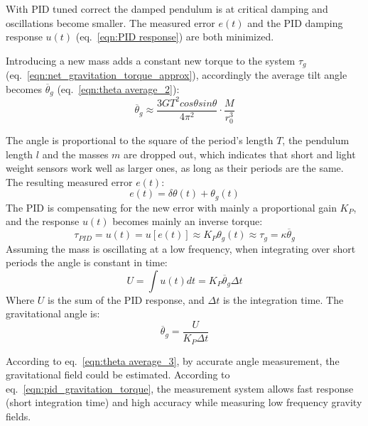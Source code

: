 \documentclass[\main/master.tex]{subfiles}
\begin{document}
\par\noindent
With PID tuned correct the damped pendulum is at critical damping and oscillations become smaller. The measured error $e(t)$ and the PID damping response $u(t)$ (eq.~\ref{eqn:PID response}) are both minimized. 
\par\noindent
Introducing a new mass adds a constant new torque to the system $\tau_g$ (eq.~\ref{eqn:net_gravitation_torque_approx}), accordingly the average tilt angle becomes $\overline{\theta}_g$ (eq.~\ref{eqn:theta average_2}):
\begin{equation}
\overline{\theta}_g  \approx \frac{3GT^2cos\theta sin\theta}{4\pi^2 } \cdot \frac{M}{r_0^3}   \label{eqn:theta average_3}
\end{equation}
\par\noindent
The angle is proportional to the square of the period's length $T$, the pendulum length $l$ and the masses $m$ are dropped out, which indicates that short and light weight sensors work well as larger ones, as long as their periods are the same. The resulting measured error $e(t)$:
\begin{equation}
e(t) = \delta\theta(t) + \theta_g(t)    \label{eqn:error_measurement}
\end{equation}
The PID is compensating for the new error with mainly a proportional gain $K_P$, and the response $u(t)$ becomes mainly an inverse torque:
\begin{equation}
\tau_{PID} = u(t) = u[e(t)] \approx K_P\theta_g(t) \approx \tau_{g} = \kappa \overline{\theta}_g 
\label{eqn:PID_response}
\end{equation}
Assuming the mass is oscillating at a low frequency, when integrating over short periods the angle is constant in time:
\begin{equation}
U = \int u(t) dt = K_P\overline{\theta}_g\Delta t 
\label{eqn:PID_measurement_eqn}
\end{equation}
Where $U$ is the sum of the PID response, and $\Delta t$ is the integration time. The gravitational angle is:
\begin{equation}
\overline{\theta}_g = \frac{U}{K_P\Delta t}      \label{eqn:pid_gravitation_torque}
\end{equation}
\par\noindent
According to eq.~\ref{eqn:theta average_3}, by accurate angle measurement, the gravitational field could be estimated. According to eq.~\ref{eqn:pid_gravitation_torque}, the measurement system allows fast response (short integration time) and high accuracy while measuring low frequency gravity fields. 

 
 
 
 
\end{document}
